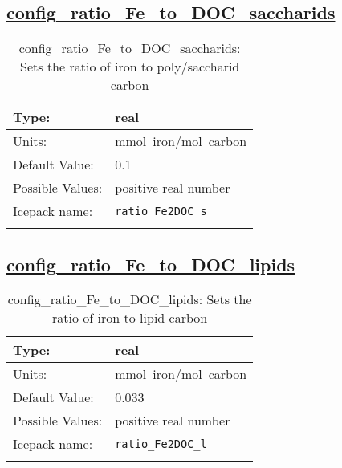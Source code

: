 \subsection[config\_ratio\_Fe\_to\_DOC\_saccharids]{\hyperref[sec:nm_tab_biogeochemistry]{config\_ratio\_Fe\_to\_DOC\_saccharids}}
\label{subsec:nm_sec_config_ratio_Fe_to_DOC_saccharids}
\begin{center}
\begin{longtable}{| p{2.0in} || p{4.0in} |}
    \hline
    Type: & real \\
    \hline
    Units: & \si{mmol.iron/mol.carbon} \\
    \hline
    Default Value: & 0.1 \\
    \hline
    Possible Values: & positive real number \\
    \hline
    \hline
    Icepack name: & \verb+ratio_Fe2DOC_s+ \\
    \caption{config\_ratio\_Fe\_to\_DOC\_saccharids: Sets the ratio of iron to poly/saccharid carbon}
\end{longtable}
\end{center}
\subsection[config\_ratio\_Fe\_to\_DOC\_lipids]{\hyperref[sec:nm_tab_biogeochemistry]{config\_ratio\_Fe\_to\_DOC\_lipids}}
\label{subsec:nm_sec_config_ratio_Fe_to_DOC_lipids}
\begin{center}
\begin{longtable}{| p{2.0in} || p{4.0in} |}
    \hline
    Type: & real \\
    \hline
    Units: & \si{mmol.iron/mol.carbon} \\
    \hline
    Default Value: & 0.033 \\
    \hline
    Possible Values: & positive real number \\
    \hline
    \hline
    Icepack name: & \verb+ratio_Fe2DOC_l+ \\
    \caption{config\_ratio\_Fe\_to\_DOC\_lipids: Sets the ratio of iron to lipid carbon}
\end{longtable}
\end{center}
